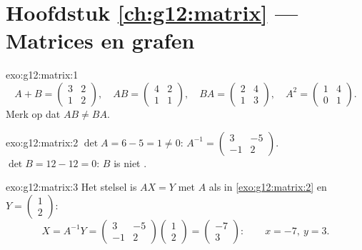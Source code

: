 \section*{Hoofdstuk \ref{ch:g12:matrix} --- Matrices en grafen}

\begin{solution}{exo:g12:matrix:1}
\[
A + B = \begin{pmatrix} 3 & 2\\ 1 & 2\end{pmatrix}, \quad
AB = \begin{pmatrix} 4 & 2\\ 1 & 1\end{pmatrix}, \quad
BA = \begin{pmatrix} 2 & 4\\ 1 & 3\end{pmatrix}, \quad
A^2 = \begin{pmatrix} 1 & 4\\ 0 & 1\end{pmatrix}.
\]
Merk op dat $AB \neq BA$.
\end{solution}

\begin{solution}{exo:g12:matrix:2}
$\det A = 6 - 5 = 1 \neq 0$:
$A^{-1} = \begin{pmatrix} 3 & -5\\ -1 & 2 \end{pmatrix}$.
$\det B = 12 - 12 = 0$: $B$ is niet .
\end{solution}

\begin{solution}{exo:g12:matrix:3}
Het stelsel is $AX = Y$ met $A$ als in \cref{exo:g12:matrix:2} en
$Y = \begin{pmatrix} 1\\ 2\end{pmatrix}$:
\[
X = A^{-1}Y = \begin{pmatrix} 3 & -5\\ -1 & 2\end{pmatrix}
\begin{pmatrix} 1\\ 2\end{pmatrix}
= \begin{pmatrix} -7\\ 3\end{pmatrix}:
\qquad x = -7,\ y = 3 .
\]
\end{solution}

